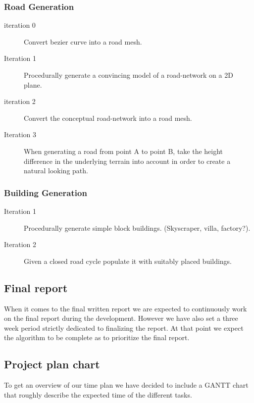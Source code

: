 \subsubsection{Road Generation}
\begin{description}
  \item[iteration 0] Convert bezier curve into a road mesh. %
  \item[Iteration 1] Procedurally generate a convincing model of a road-network on a 2D plane.
  \item[iteration 2] Convert the conceptual road-network into a road mesh.
  \item[Iteration 3] When generating a road from point A to point B, take the height difference in the underlying terrain into account in order to create a natural looking path.
\end{description}

\subsubsection{Building Generation}
\begin{description}
  \item[Iteration 1] Procedurally generate simple block buildings. (Skyscraper, villa, factory?).
  \item[Iteration 2] Given a closed road cycle populate it with suitably placed buildings.
\end{description}


\subsection{Final report}
When it comes to the final written report we are expected to continuously work on the final report during the development.
However we have also set a three week period strictly dedicated to finalizing the report.
At that point we expect the algorithm to be complete as to prioritize the final report.

\subsection{Project plan chart}
To get an overview of our time plan we have decided to include a GANTT chart that roughly describe the expected time of the different tasks.

